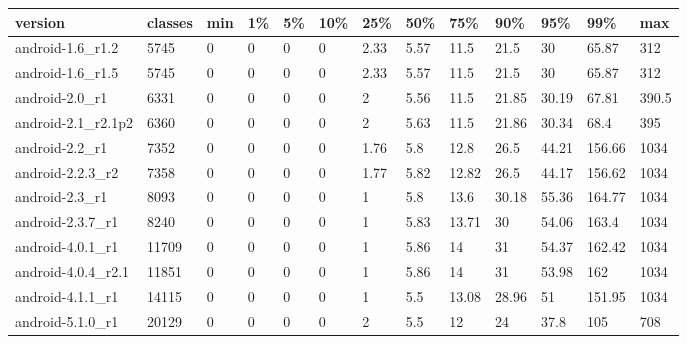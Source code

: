\begin{tabular}{|l|l|l|l|l|l|l|l|l|l|l|l|l|}
\hline
version&classes&min&1\%&5\%&10\%&25\%&50\%&75\%&90\%&95\%&99\%&max\\
\hline
android-1.6\_r1.2&5745&0&0&0&0&2.33&5.57&11.5&21.5&30&65.87&312\\
\hline
android-1.6\_r1.5&5745&0&0&0&0&2.33&5.57&11.5&21.5&30&65.87&312\\
\hline
android-2.0\_r1&6331&0&0&0&0&2&5.56&11.5&21.85&30.19&67.81&390.5\\
\hline
android-2.1\_r2.1p2&6360&0&0&0&0&2&5.63&11.5&21.86&30.34&68.4&395\\
\hline
android-2.2\_r1&7352&0&0&0&0&1.76&5.8&12.8&26.5&44.21&156.66&1034\\
\hline
android-2.2.3\_r2&7358&0&0&0&0&1.77&5.82&12.82&26.5&44.17&156.62&1034\\
\hline
android-2.3\_r1&8093&0&0&0&0&1&5.8&13.6&30.18&55.36&164.77&1034\\
\hline
android-2.3.7\_r1&8240&0&0&0&0&1&5.83&13.71&30&54.06&163.4&1034\\
\hline
android-4.0.1\_r1&11709&0&0&0&0&1&5.86&14&31&54.37&162.42&1034\\
\hline
android-4.0.4\_r2.1&11851&0&0&0&0&1&5.86&14&31&53.98&162&1034\\
\hline
android-4.1.1\_r1&14115&0&0&0&0&1&5.5&13.08&28.96&51&151.95&1034\\
\hline
android-5.1.0\_r1&20129&0&0&0&0&2&5.5&12&24&37.8&105&708\\
\hline
\end{tabular}
